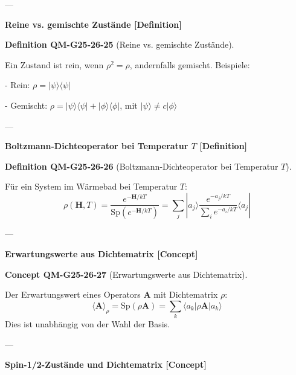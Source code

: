\documentclass[10pt, letterpaper]{article}
\newcommand{\CustomHeading}[3]{%
  \par\medskip\noindent%
  \textbf{#1 #2} \textnormal{(#3)}.\enskip%
}
\newenvironment{DEF}[2]{\begin{unitbox}\CustomHeading{Definition}{#1}{#2}}{\end{unitbox}}
\newenvironment{CONC}[2]{\begin{unitbox}\CustomHeading{Concept}{#1}{#2}}{\end{unitbox}}
\begin{document}
---

\textbf{Reine vs. gemischte Zustände [Definition]}

\begin{DEF}{QM-G25-26-25}{Reine vs. gemischte Zustände}
Ein Zustand ist rein, wenn $\rho^2 = \rho$, andernfalls gemischt. Beispiele:

- Rein: $\rho = |\psi\rangle\langle \psi|$

- Gemischt: $\rho = |\psi\rangle\langle \psi| + |\phi\rangle\langle \phi|$, mit $|\psi\rangle \neq c|\phi\rangle$
\end{DEF}

---

\textbf{Boltzmann-Dichteoperator bei Temperatur \( T \) [Definition]}

\begin{DEF}{QM-G25-26-26}{Boltzmann-Dichteoperator bei Temperatur \( T \)}
Für ein System im Wärmebad bei Temperatur $T$:
\[
\rho(\mathbf{H}, T) = \frac{e^{-\mathbf{H}/kT}}{\text{Sp}(e^{-\mathbf{H}/kT})} = \sum_j |a_j\rangle \frac{e^{-a_j/kT}}{\sum_i e^{-a_i/kT}} \langle a_j |
\]
\end{DEF}

---

\textbf{Erwartungswerte aus Dichtematrix [Concept]}

\begin{CONC}{QM-G25-26-27}{Erwartungswerte aus Dichtematrix}
Der Erwartungswert eines Operators $\mathbf{A}$ mit Dichtematrix $\rho$:
\[
\langle \mathbf{A} \rangle_\rho = \text{Sp}(\rho \mathbf{A}) = \sum_k \langle a_k | \rho \mathbf{A} | a_k \rangle
\]
Dies ist unabhängig von der Wahl der Basis.
\end{CONC}



---

\textbf{Spin-1/2-Zustände und Dichtematrix [Concept]}
\end{document}
